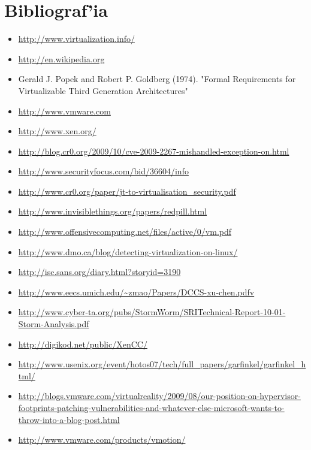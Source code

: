 \section{Bibliograf'ia}

\begin{itemize}
	\item \url{http://www.virtualization.info/}
	\item \url{http://en.wikipedia.org}
	\item Gerald J. Popek and Robert P. Goldberg (1974). "Formal Requirements for Virtualizable Third Generation 
Architectures"
	\item \url{http://www.vmware.com}
	\item \url{http://www.xen.org/}
	\item \url{http://blog.cr0.org/2009/10/cve-2009-2267-mishandled-exception-on.html}
	\item \url{http://www.securityfocus.com/bid/36604/info}
	\item \url{http://www.cr0.org/paper/jt-to-virtualisation_security.pdf}
	\item \url{http://www.invisiblethings.org/papers/redpill.html}
	\item \url{http://www.offensivecomputing.net/files/active/0/vm.pdf}
	\item \url{http://www.dmo.ca/blog/detecting-virtualization-on-linux/}
	\item \url{http://isc.sans.org/diary.html?storyid=3190}
	\item \url{http://www.eecs.umich.edu/~zmao/Papers/DCCS-xu-chen.pdfv}
	\item \url{http://www.cyber-ta.org/pubs/StormWorm/SRITechnical-Report-10-01-Storm-Analysis.pdf}
	\item \url{http://digikod.net/public/XenCC/}
	\item \url{http://www.usenix.org/event/hotos07/tech/full_papers/garfinkel/garfinkel_html/}

	\item \url{http://blogs.vmware.com/virtualreality/2009/08/our-position-on-hypervisor-footprints-patching-vulnerabilities-and-whatever-else-microsoft-wants-to-throw-into-a-blog-post.html}

	\item \url{http://www.vmware.com/products/vmotion/}

\end{itemize}